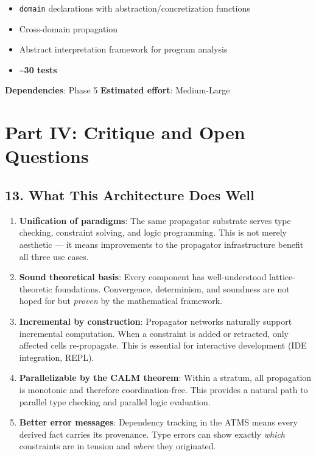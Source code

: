 \documentclass[11pt]{article}
\begin{document}
\begin{itemize}
\item \texttt{domain} declarations with abstraction/concretization functions
\item Cross-domain propagation
\item Abstract interpretation framework for program analysis
\item \textbf{\textasciitilde{}30 tests}
\end{itemize}

\textbf{Dependencies}: Phase 5
\textbf{Estimated effort}: Medium-Large
\section{Part IV: Critique and Open Questions}
\label{sec:org84382c5}

\subsection{13. What This Architecture Does Well}
\label{sec:org8119818}

\begin{enumerate}
\item \textbf{Unification of paradigms}: The same propagator substrate serves type
checking, constraint solving, and logic programming. This is not merely
aesthetic --- it means improvements to the propagator infrastructure
benefit all three use cases.

\item \textbf{Sound theoretical basis}: Every component has well-understood
lattice-theoretic foundations. Convergence, determinism, and soundness
are not hoped for but \emph{proven} by the mathematical framework.

\item \textbf{Incremental by construction}: Propagator networks naturally support
incremental computation. When a constraint is added or retracted, only
affected cells re-propagate. This is essential for interactive
development (IDE integration, REPL).

\item \textbf{Parallelizable by the CALM theorem}: Within a stratum, all
propagation is monotonic and therefore coordination-free. This
provides a natural path to parallel type checking and parallel
logic evaluation.

\item \textbf{Better error messages}: Dependency tracking in the ATMS means every
derived fact carries its provenance. Type errors can show exactly
\emph{which} constraints are in tension and \emph{where} they originated.
\end{enumerate}
\end{document}
